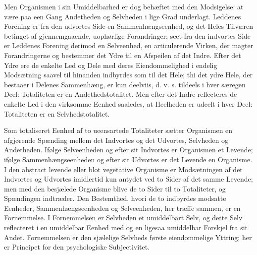 \documentclass[11pt]{book}
\newcommand{\opage}[1]{\marginnote{\footnotesize\textit{[#1]}}}
\begin{document}
Men Organismen i sin Umiddelbarhed er dog behæftet med den Modsigelse: at være
paa een Gang Andetheden og Selvheden i lige Grad underlagt. Leddenes Forening
er fra den udvortes Side en Sammenhængseenhed, og det Heles Tilværen betinget
af gjennemgaaende, uophørlige Forandringer; seet fra den indvortes Side er
Leddenes Forening derimod en Selveenhed, en articulerende Virken, der magter
Forandringerne og bestemmer det Ydre til en Afspeilen af det Indre. Efter
\opage{132} \setcounter{footnote}{0}%
det Ydre ere de enkelte Led og Dele med deres Eiendommelighed i endelig
Modsætning saavel til hinanden indbyrdes som til det Hele; thi det ydre Hele,
der bestaaer i Delenes Sammenhæng, er kun deelviis, d. v. s. tildeels i hver
særegen Deel: Totaliteten er en Andethedstotalitet. Men efter det Indre
reflecteres de enkelte Led i den virksomme Eenhed saaledes, at Heelheden er
udeelt i hver Deel: Totaliteten er en Selvhedstotalitet.

Som totaliseret Eenhed af to ueensartede Totaliteter sætter Organismen en
afgjørende Spænding mellem det Indvortes og det Udvortes, Selvheden og
Andetheden. Ifølge Selveenheden og efter sit Indvortes er Organismen et
Levende; ifølge Sammenhængseenheden og efter sit Udvortes er det Levende en
Organisme. I den abstract levende eller blot vegetative Organisme er
Modsætningen af det Indvortes og Udvortes imidlertid kun antydet ved to Sider
af det samme Levende; men med den besjælede Organisme blive de to Sider til to
Totaliteter, og Spændingen indtræder. Den Bestemthed, hvori de to indbyrdes
modsatte Eenheder, Sammenhængseenheden og Selveenheden, her træffe sammen, er
en Fornemmelse. I Fornemmelsen er Selvheden et umiddelbart Selv, og dette Selv
reflecteret i en umiddelbar Eenhed med og en ligesaa umiddelbar Forskjel fra
sit Andet. Fornemmelsen er den sjælelige Selvheds første eiendommelige
Yttring; her er Principet for den psychologiske Subjectivitet.
\end{document}
